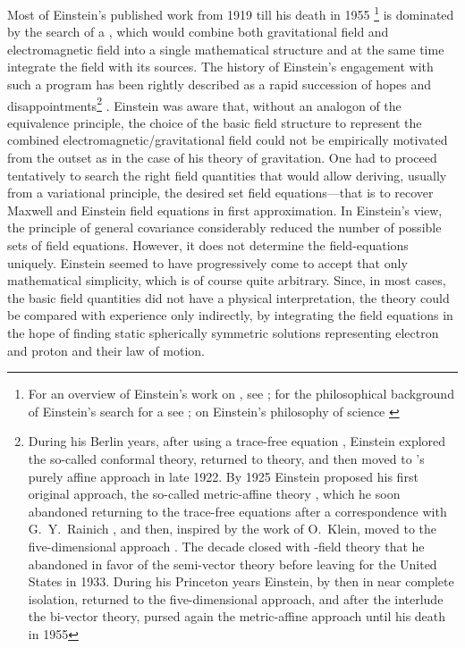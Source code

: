 \documentclass[draft]{article}
\newcommand{\FP}{\german{Fernparallelismus}\xspace}
\begin{document}
Most of Einstein's published work from 1919 till his death in 1955 \citep{Einstein1955-07}\footnote{For an overview of Einstein's work on \uftp, see \citet{Sauer2014}; for the philosophical background of Einstein's search for a \uft see \citet{Dongen2010}; on Einstein's philosophy of science \citet{Ryckman2017}} is dominated by the search of a \uft, which would combine both gravitational field and electromagnetic field into a single mathematical structure and at the same time integrate the field with its sources. The history of Einstein's engagement with such a program has been rightly described as a rapid succession of hopes and disappointments\footnote{During his Berlin years, after using a trace-free equation \citep{Einstein1919}, Einstein explored the so-called conformal theory, returned to  theory, \citep{Einstein1921?} and then moved to \citep{Eddington1921}'s purely affine approach \citep{Einstein1923c,Einstein1923d,Einstein1923e} in late 1922. By 1925 Einstein proposed his first original approach, the so-called metric-affine theory \citep{Einstein1925a}, which he soon abandoned returning to the trace-free equations after a correspondence with G.~Y.~Rainich \citep{Einstein1927c}, and then, inspired by the work of O.~Klein, moved to the five-dimensional approach \citep{Einstein19271,Einstein19272}. The decade closed with \FP-field theory that he abandoned in favor of the semi-vector theory before leaving for the United States in 1933. During his Princeton years Einstein, by then in near complete isolation, returned to the five-dimensional approach, and after the interlude the bi-vector theory, pursed again the metric-affine approach until his death in 1955} \citep[187]{Vizgin1994}. Einstein was aware that, without an analogon of the equivalence principle, the choice of the basic field structure to represent the combined electromagnetic/gravitational field could not be empirically motivated from the outset as in the case of his theory of gravitation. One had to proceed tentatively to search the right field quantities that would allow deriving, usually from a variational principle, the desired set field equations---that is to recover Maxwell and Einstein field equations in first approximation. In Einstein's view, the principle of general covariance considerably reduced the number of possible sets of field equations. However, it does not determine the field-equations uniquely. Einstein seemed to have progressively come to accept that only mathematical simplicity, which is of course quite arbitrary. Since, in most cases, the basic field quantities did not have a physical interpretation, the theory could be compared with experience only indirectly, by integrating the field equations in the hope of finding static spherically symmetric solutions representing electron and proton and their law of motion. 
\end{document}
